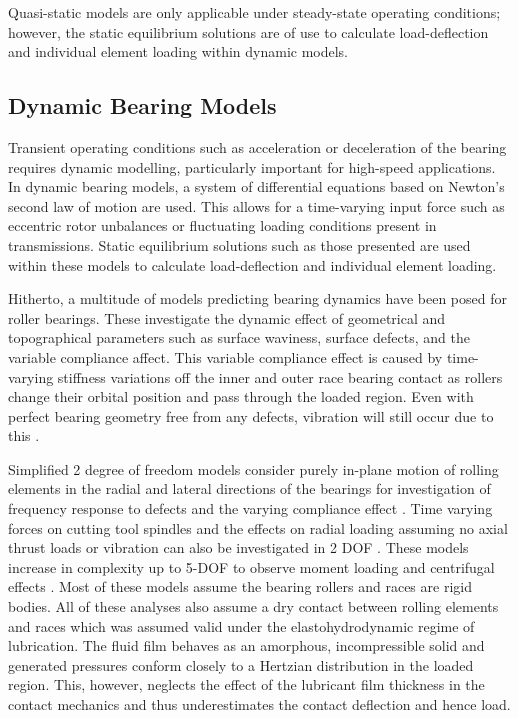 Quasi-static models are only applicable under steady-state operating conditions; however, the static equilibrium solutions \cite{Andreason1973} \cite{Liu1976} \cite{DeMul1989_1} are of use to calculate load-deflection and individual element loading within dynamic models.

\subsection{Dynamic Bearing Models}
Transient operating conditions such as acceleration or deceleration of the bearing requires dynamic modelling, particularly important for high-speed applications. In dynamic bearing models, a system of differential equations based on Newton’s second law of motion are used. This allows for a time-varying input force such as eccentric rotor unbalances or fluctuating loading conditions present in transmissions. Static equilibrium solutions such as those presented are used within these models to calculate load-deflection and individual element loading. 

Hitherto, a multitude of models predicting bearing dynamics have been posed for roller bearings. These investigate the dynamic effect of geometrical and topographical parameters such as surface waviness, surface defects, and the variable compliance affect. This variable compliance effect is caused by time-varying stiffness variations off the inner and outer race bearing contact as rollers change their orbital position and pass through the loaded region. Even with perfect bearing geometry free from any defects, vibration will still occur due to this \cite{Sopanen2003_1}.
  
Simplified 2 degree of freedom models \cite{Walters1971} consider purely in-plane motion of rolling elements in the radial and lateral directions of the bearings for investigation of frequency response to defects \cite{Meyer1980} and the varying compliance effect \cite{Sunnersjo1978}.  Time varying forces on cutting tool spindles and the effects on radial loading assuming no axial thrust loads or vibration can also be investigated in 2 DOF \cite{Matsubara1988}. These models increase in complexity up to 5-DOF  to observe moment loading and centrifugal effects \cite{Gupta1979} \cite{Aini1990} \cite{Rahnejat2004}. Most of these models assume the bearing rollers and races are rigid bodies. All of these analyses also assume a dry contact between rolling elements and races which was assumed valid under the elastohydrodynamic regime of lubrication. The fluid film behaves as an amorphous, incompressible solid and generated pressures conform closely to a Hertzian distribution in the loaded region. This, however, neglects the effect of the lubricant film thickness in the contact mechanics and thus underestimates the contact deflection and hence load.

